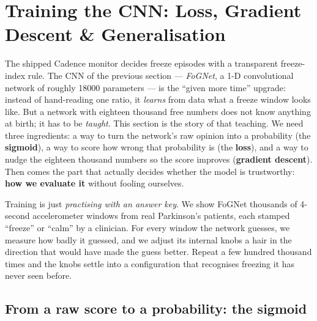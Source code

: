 \section{Training the CNN: Loss, Gradient Descent \& Generalisation}
\label{sec:training}

The shipped Cadence monitor decides freeze episodes with a transparent freeze-index
rule. The CNN of the previous section --- \emph{FoGNet}, a 1-D convolutional network
of roughly \num{18000} parameters --- is the ``given more time'' upgrade: instead of
hand-reading one ratio, it \emph{learns} from data what a freeze window looks like.
But a network with eighteen thousand free numbers does not know anything at birth; it
has to be \emph{taught}. This section is the story of that teaching. We need three
ingredients: a way to turn the network's raw opinion into a probability (the
\textbf{sigmoid}), a way to score how wrong that probability is (the \textbf{loss}),
and a way to nudge the eighteen thousand numbers so the score improves (\textbf{gradient
descent}). Then comes the part that actually decides whether the model is trustworthy:
\textbf{how we evaluate it} without fooling ourselves.

\begin{intuition}
Training is just \emph{practising with an answer key}. We show FoGNet thousands of
4-second accelerometer windows from real Parkinson's patients, each stamped
``freeze'' or ``calm'' by a clinician. For every window the network guesses, we measure
how badly it guessed, and we adjust its internal knobs a hair in the direction that
would have made the guess better. Repeat a few hundred thousand times and the knobs
settle into a configuration that recognises freezing it has never seen before.
\end{intuition}

\subsection{From a raw score to a probability: the sigmoid}

